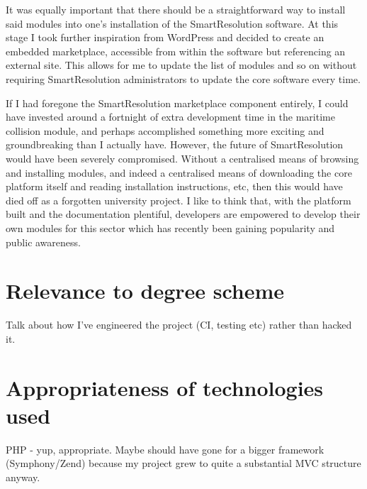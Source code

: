 It was equally important that there should be a straightforward way to install said modules into one's installation of the SmartResolution software. At this stage I took further inspiration from WordPress and decided to create an embedded marketplace, accessible from within the software but referencing an external site. This allows for me to update the list of modules and so on without requiring SmartResolution administrators to update the core software every time.

If I had foregone the SmartResolution marketplace component entirely, I could have invested around a fortnight of extra development time in the maritime collision module, and perhaps accomplished something more exciting and groundbreaking than I actually have. However, the future of SmartResolution would have been severely compromised. Without a centralised means of browsing and installing modules, and indeed a centralised means of downloading the core platform itself and reading installation instructions, etc, then this would have died off as a forgotten university project. I like to think that, with the platform built and the documentation plentiful, developers are empowered to develop their own modules for this sector which has recently been gaining popularity and public awareness.

\section{Relevance to degree scheme}

Talk about how I've engineered the project (CI, testing etc) rather than hacked it.

\section{Appropriateness of technologies used}

PHP - yup, appropriate. Maybe should have gone for a bigger framework (Symphony/Zend) because my project grew to quite a substantial MVC structure anyway.